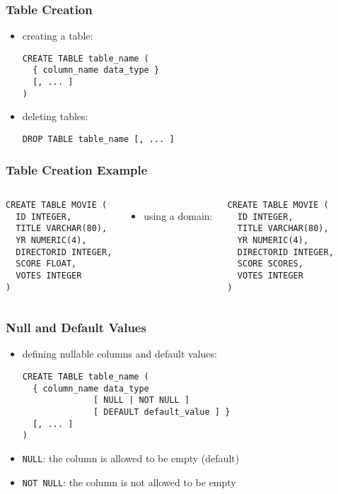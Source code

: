 \documentclass[dvipsnames]{beamer}
\theoremstyle{plain}
\begin{document}
\begin{frame}[fragile]
  \frametitle{Table Creation}

  \begin{itemize}
    \item creating a table:
    \begin{lstlisting}
CREATE TABLE table_name (
  { column_name data_type }
  [, ... ]
)
    \end{lstlisting}

    \item deleting tables:
    \begin{lstlisting}
DROP TABLE table_name [, ... ]
    \end{lstlisting}
  \end{itemize}
\end{frame}

\begin{frame}[fragile]
  \frametitle{Table Creation Example}

  \begin{columns}[b]
    \begin{lstlisting}
CREATE TABLE MOVIE (
  ID INTEGER,
  TITLE VARCHAR(80),
  YR NUMERIC(4),
  DIRECTORID INTEGER,
  SCORE FLOAT,
  VOTES INTEGER
)
    \end{lstlisting}

    \pause
    \begin{itemize}
      \item using a domain:
    \end{itemize}

    \begin{lstlisting}
CREATE TABLE MOVIE (
  ID INTEGER,
  TITLE VARCHAR(80),
  YR NUMERIC(4),
  DIRECTORID INTEGER,
  SCORE SCORES,
  VOTES INTEGER
)
    \end{lstlisting}
  \end{columns}
\end{frame}

\begin{frame}[fragile]
  \frametitle{Null and Default Values}

  \begin{itemize}
    \item defining nullable columns and default values:
    \begin{lstlisting}
CREATE TABLE table_name (
  { column_name data_type
              [ NULL | NOT NULL ]
              [ DEFAULT default_value ] }
  [, ... ]
)
    \end{lstlisting}

    \item \texttt{NULL}: the column is allowed to be empty (default)
    \item \texttt{NOT NULL}: the column is not allowed to be empty
  \end{itemize}
\end{frame}
\end{document}
